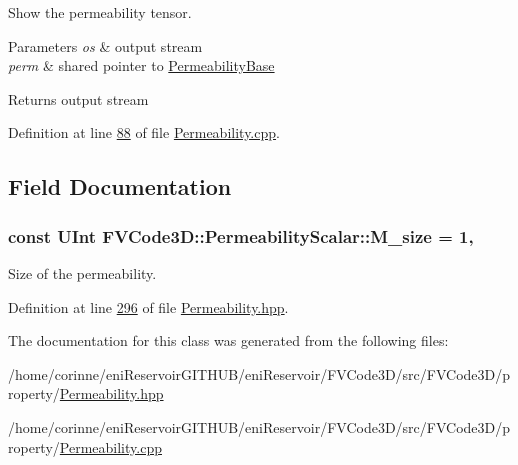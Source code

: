 Show the permeability tensor. 


\begin{DoxyParams}{Parameters}
{\em os} & output stream \\
\hline
{\em perm} & shared pointer to \hyperlink{classFVCode3D_1_1PermeabilityBase}{Permeability\+Base} \\
\hline
\end{DoxyParams}
\begin{DoxyReturn}{Returns}
output stream 
\end{DoxyReturn}


Definition at line \hyperlink{Permeability_8cpp_source_l00088}{88} of file \hyperlink{Permeability_8cpp_source}{Permeability.\+cpp}.



\subsection{Field Documentation}
\subsubsection[{\texorpdfstring{M\+\_\+size}{M_size}}]{\setlength{\rightskip}{0pt plus 5cm}const {\bf U\+Int} F\+V\+Code3\+D\+::\+Permeability\+Scalar\+::\+M\+\_\+size = 1\hspace{0.3cm}{\ttfamily [static]}, {\ttfamily [private]}}\hypertarget{classFVCode3D_1_1PermeabilityScalar_a6f91aef28a6af7ae9c69e0c43dc445ca}{}\label{classFVCode3D_1_1PermeabilityScalar_a6f91aef28a6af7ae9c69e0c43dc445ca}


Size of the permeability. 



Definition at line \hyperlink{Permeability_8hpp_source_l00296}{296} of file \hyperlink{Permeability_8hpp_source}{Permeability.\+hpp}.



The documentation for this class was generated from the following files\+:\begin{DoxyCompactItemize}
\item 
/home/corinne/eni\+Reservoir\+G\+I\+T\+H\+U\+B/eni\+Reservoir/\+F\+V\+Code3\+D/src/\+F\+V\+Code3\+D/property/\hyperlink{Permeability_8hpp}{Permeability.\+hpp}\item 
/home/corinne/eni\+Reservoir\+G\+I\+T\+H\+U\+B/eni\+Reservoir/\+F\+V\+Code3\+D/src/\+F\+V\+Code3\+D/property/\hyperlink{Permeability_8cpp}{Permeability.\+cpp}\end{DoxyCompactItemize}
